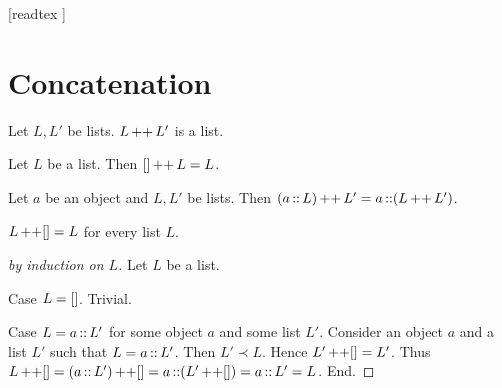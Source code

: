\documentclass[10pt]{article}
\begin{document}
  \begin{imports}
    \begin{forthel}
      [readtex ]
    \end{forthel}
  \end{imports}


  \section*{Concatenation}

  \begin{forthel}
    \begin{signature}
      Let $L, L'$ be lists.
      $L \mathop{++} L'$ is a list.
    \end{signature}
  \end{forthel}

  \begin{forthel}
    \begin{axiom}
      Let $L$ be a list.
      Then $[] \mathop{++} L = L$.
    \end{axiom}
  \end{forthel}

  \begin{forthel}
    \begin{axiom}
      Let $a$ be an object and $L, L'$ be lists.
      Then $(a \mathop{::} L) \mathop{++} L' = a \mathop{::} (L \mathop{++} L')$.
    \end{axiom}
  \end{forthel}

  \begin{forthel}
    \begin{proposition}
      $L \mathop{++} [] = L$ for every list $L$.
    \end{proposition}
    \begin{proof}[by induction on $L$]
      Let $L$ be a list.

      Case $L = []$. Trivial.
      
      Case $L = a \mathop{::} L'$ for some object $a$ and some list $L'$.
        Consider an object $a$ and a list $L'$ such that $L = a \mathop{::} L'$.
        Then $L' \prec L$.
        Hence $L' \mathop{++} [] = L'$.
        Thus $L \mathop{++} []
          = (a \mathop{::} L') \mathop{++} []
          = a \mathop{::} (L' \mathop{++} [])
          = a \mathop{::} L'
          = L$.
      End.
    \end{proof}
  \end{forthel}
\end{document}
